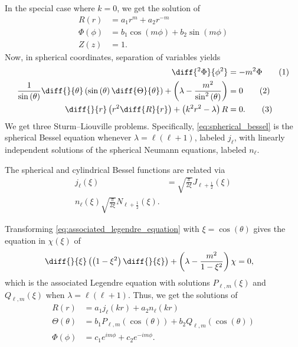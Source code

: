 \documentclass[10pt]{mypackage}
\begin{document}
  In the special case where $k = 0$, we get the solution of
  \begin{align*}
    R\left( r \right) &= a_1r^{m} + a_2r^{-m}\\
    \Phi(\phi) &=  b_1\cos\left( m\phi \right) + b_2\sin\left( m\phi \right)\\
    Z(z) &= 1.
  \end{align*}
  Now, in spherical coordinates, separation of variables yields
  \begin{align*}
    \diff{^2\Phi}{\phi^2} &= -m^2\Phi\label{eq:SHO_again}\tag{1}\\
    \frac{1}{\sin\left( \theta \right)}\diff{}{\theta}\left( \sin\left( \theta \right)\diff{\Theta}{\theta} \right) + \left( \lambda - \frac{m^2}{\sin^2\left( \theta \right)} \right) &= 0\label{eq:associated_legendre_equation}\tag{2}\\
    \diff{}{r}\left( r^2\diff{R}{r} \right) + \left( k^2r^2 - \lambda \right)R &= 0.\label{eq:spherical_bessel}\tag{3}
  \end{align*}
  We get three Sturm--Liouville problems. Specifically, \eqref{eq:spherical_bessel} is the spherical Bessel equation whenever $\lambda = \ell\left( \ell + 1 \right)$, labeled $j_{\ell}$, with linearly independent solutions of the spherical Neumann equations, labeled $n_{\ell}$.
  \begin{remark}
  The spherical and cylindrical Bessel functions are related via
  \begin{align*}
    j_{\ell}\left( \xi \right) &= \sqrt{\frac{\pi}{2\xi}}J_{\ell + \frac{1}{2}}\left( \xi \right)\\
    n_{\ell}\left( \xi \right) \sqrt{\frac{\pi}{2\xi}}N_{\ell + \frac{1}{2}}\left( \xi \right).
  \end{align*}
  \end{remark}
  Transforming \eqref{eq:associated_legendre_equation} with $\xi = \cos\left( \theta \right)$ gives the equation in $\chi\left( \xi \right)$ of
  \begin{align*}
    \diff{}{\xi}\left( \left( 1-\xi^2 \right)\diff{}{\xi} \right) + \left( \lambda - \frac{m^2}{1-\xi^2} \right)\chi &= 0,
  \end{align*}
  which is the associated Legendre equation with solutions $P_{\ell,m}\left( \xi \right)$ and $Q_{\ell,m}\left( \xi \right)$ when $\lambda = \ell\left( \ell + 1 \right)$. Thus, we get the solutions of
  \begin{align*}
    R(r) &= a_1j_{\ell}\left( kr \right) + a_2n_{\ell}\left( kr \right)\\
    \Theta(\theta) &= b_1P_{\ell,m}\left( \cos\left( \theta \right) \right) + b_2Q_{\ell,m}\left( \cos\left( \theta \right) \right)\\
    \Phi(\phi) &= c_1e^{im\phi} + c_2e^{-im\phi}.
  \end{align*}
\end{document}
